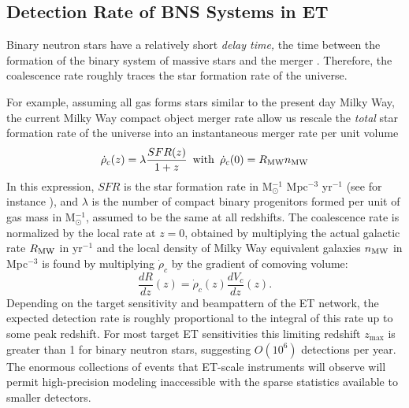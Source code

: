 

\subsection{Detection Rate of BNS Systems in ET}
\label{box:nsrateestimate}
Binary neutron stars have a relatively short {\em delay time,} the 
time between the formation of the binary system of massive stars and the merger \cite{Regimbau:2009}. 
Therefore, the coalescence
rate roughly traces the star formation rate of the universe.

For example, assuming all gas forms stars 
similar to the present day Milky Way, the current Milky Way compact 
object merger rate allow us rescale the \emph{total} 
star formation rate of the universe into an 
instantaneous merger rate per unit volume    
\begin{equation}
\dot{\rho}_{c}(z) = \lambda \frac{SFR(z)}{1+z}  \,\ \mathrm{with}\,\ \dot{\rho}_{c}(0) = R_{\rm{MW}} n_{\rm{MW}}
\end{equation}
In this expression, $SFR$ is the star formation rate in M$_{\odot}^{-1}$ Mpc$^{-3}$ yr$^{-1}$ (see for instance \cite{sfr-HopkinsBeacom2006,PSellipticals} ),  and $\lambda$ is the number of compact binary progenitors formed per unit of gas mass in M$_{\odot}^{-1}$, assumed to be the same at all redshifts. The coalescence rate is normalized by the local rate at $z=0$, obtained by multiplying the actual galactic rate $R_{\rm{MW}}$ in yr$^{-1}$ and the local density of Milky Way equivalent galaxies $n_{\rm{MW}}$ in Mpc$^{-3}$ is found by multiplying $\dot{\rho}_c$ by the gradient of comoving volume:
\begin{equation}
\frac{dR}{dz} (z)= \dot{\rho}_c(z) \frac{dV_c}{dz}(z).
\label{dRdz}
\end{equation}
Depending on the target sensitivity and beampattern of the ET 
network, the expected detection rate is roughly proportional to the 
integral of this rate up to some peak redshift.  For most target 
ET sensitivities this limiting redshift  $z_{\max}$ is greater 
than 1 for binary neutron stars, suggesting $O(10^{6})$ detections 
per year.  The enormous collections of events that ET-scale 
instruments will observe will permit high-precision modeling 
inaccessible with the sparse statistics available to smaller 
detectors.

